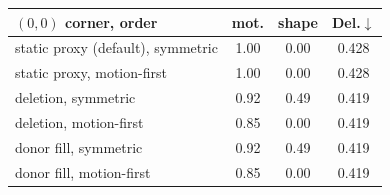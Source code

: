 \begin{tabular}{l ccc}
\toprule
$(0,0)$ corner, order & mot. & shape & Del.$\downarrow$\\
\midrule
static proxy (default), symmetric & 1.00 & 0.00 & 0.428\\
static proxy, motion-first & 1.00 & 0.00 & 0.428\\
deletion, symmetric & 0.92 & 0.49 & 0.419\\
deletion, motion-first & 0.85 & 0.00 & 0.419\\
donor fill, symmetric & 0.92 & 0.49 & 0.419\\
donor fill, motion-first & 0.85 & 0.00 & 0.419\\
\bottomrule
\end{tabular}
